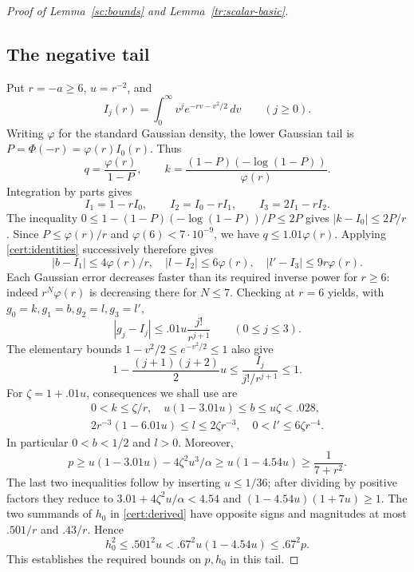 \begin{proof}[Proof of Lemma~\ref{sc:bounds} and Lemma~\ref{tr:scalar-basic}]
\subsection*{The negative tail}
Put $r=-a\ge6$, $u=r^{-2}$, and
\[
 I_j(r)=\int_0^\infty v^j e^{-rv-v^2/2}\,dv\qquad(j\ge0).
\]
Writing $\varphi$ for the standard Gaussian density, the lower Gaussian tail
is $P=\Phi(-r)=\varphi(r)I_0(r)$. Thus
\[
 q=\frac{\varphi(r)}{1-P},\qquad
 k=\frac{(1-P)(-\log(1-P))}{\varphi(r)}.
\]
Integration by parts gives
\[
 I_1=1-rI_0,\qquad I_2=I_0-rI_1,\qquad I_3=2I_1-rI_2.
\]
The inequality $0\le1-(1-P)(-\log(1-P))/P\le2P$ gives
$|k-I_0|\le2P/r$. Since $P\le\varphi(r)/r$ and
$\varphi(6)<7\cdot10^{-9}$, we have $q\le1.01\varphi(r)$.
Applying \eqref{cert:identities} successively therefore gives
\[
 |b-I_1|\le4\varphi(r)/r,\quad
 |l-I_2|\le6\varphi(r),\quad
 |l'-I_3|\le9r\varphi(r).
\]
Each Gaussian error decreases faster than its required inverse power for
$r\ge6$: indeed $r^N\varphi(r)$ is decreasing there for $N\le7$.
Checking at $r=6$ yields, with $g_0=k,g_1=b,g_2=l,g_3=l'$,
\begin{equation}\label{cert:left-errors}
 |g_j-I_j|\le .01u\frac{j!}{r^{j+1}}\qquad(0\le j\le3).
\end{equation}
The elementary bounds $1-v^2/2\le e^{-v^2/2}\le1$ also give
\begin{equation}\label{cert:integral-errors}
 1-\frac{(j+1)(j+2)}2u
 \le \frac{I_j}{j!/r^{j+1}}\le1.
\end{equation}
For $\zeta=1+.01u$, consequences we shall use are
\[
 \begin{array}{c}
 0<k\le\zeta/r,\quad
 u(1-3.01u)\le b\le u\zeta<.028,\\
 2r^{-3}(1-6.01u)\le l\le2\zeta r^{-3},\quad
 0<l'\le6\zeta r^{-4}.
 \end{array}
\]
In particular $0<b<1/2$ and $l>0$. Moreover,
\[
 p\ge u(1-3.01u)-4\zeta^2u^3/\alpha
       \ge u(1-4.54u)\ge\frac1{7+r^2}.
\]
The last two inequalities follow by inserting $u\le1/36$; after dividing
by positive factors they reduce to
$3.01+4\zeta^2u/\alpha<4.54$ and
$(1-4.54u)(1+7u)\ge1$.
The two summands of $h_0$ in \eqref{cert:derived} have opposite signs
and magnitudes at most $.501/r$ and $.43/r$. Hence
\[
 h_0^2\le .501^2u<.67^2u(1-4.54u)\le .67^2p.
\]
This establishes the required bounds on $p,h_0$ in this tail.


\end{proof}
